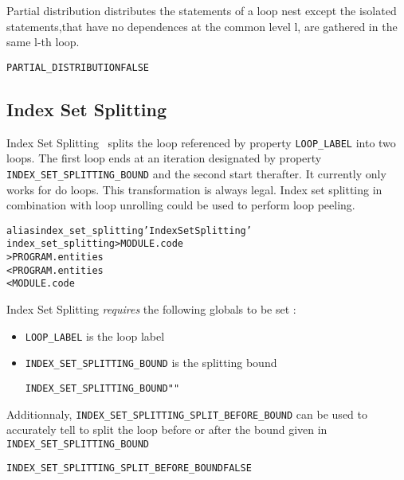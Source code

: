 \documentclass[a4paper]{report}
\newenvironment{PipsProp}{\begin{alltt}}{\end{alltt}}
\newenvironment{PipsMake}{\begin{alltt}}{\end{alltt}}
\begin{document}
Partial distribution distributes the statements of a loop nest except
 the isolated statements,that have no dependences at the common level l,
 are gathered in the same l-th loop.

\begin{PipsProp}
PARTIAL_DISTRIBUTION FALSE
\end{PipsProp}


\subsection{Index Set Splitting}
\label{subsection-index-set-splitting}
Index Set Splitting~\cite{rieblFL00}  splits the loop referenced by
property \lstinline|LOOP_LABEL| into two loops.  The
first loop ends at an iteration designated by property
\lstinline|INDEX_SET_SPLITTING_BOUND| and the second start therafter.  It
currently only works for do loops.  This transformation is always
legal. Index set
splitting in combination with loop unrolling could be used to perform
loop peeling.
\begin{PipsMake}
alias index_set_splitting 'Index Set Splitting'
index_set_splitting      > MODULE.code
        > PROGRAM.entities
        < PROGRAM.entities
        < MODULE.code
\end{PipsMake}


Index Set Splitting \emph{requires} the following globals to be set :
\begin{itemize}
    \item \lstinline|LOOP_LABEL| is the loop label
    \item \lstinline|INDEX_SET_SPLITTING_BOUND| is the splitting bound
\begin{PipsProp}
INDEX_SET_SPLITTING_BOUND ""
\end{PipsProp}
\end{itemize}

Additionnaly, \lstinline|INDEX_SET_SPLITTING_SPLIT_BEFORE_BOUND| can be used to accurately tell to split the loop before or after the bound given in \lstinline|INDEX_SET_SPLITTING_BOUND|
\begin{PipsProp}
INDEX_SET_SPLITTING_SPLIT_BEFORE_BOUND FALSE
\end{PipsProp}


\end{document}
